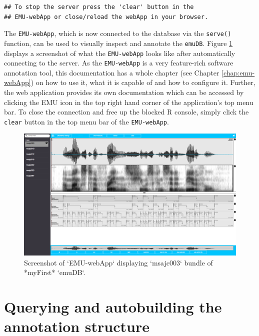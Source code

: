 \documentclass[]{book}
\theoremstyle{definition}
\theoremstyle{definition}
\theoremstyle{definition}
\theoremstyle{remark}
\begin{document}
\begin{verbatim}
## To stop the server press the 'clear' button in the 
## EMU-webApp or close/reload the webApp in your browser.
\end{verbatim}

The \texttt{EMU-webApp}, which is now connected to the database via the
\texttt{serve()} function, can be used to visually inspect and annotate
the \texttt{emuDB}. Figure \ref{fig:tutorial-emuWebAppMyFirst} displays
a screenshot of what the \texttt{EMU-webApp} looks like after
automatically connecting to the server. As the \texttt{EMU-webApp} is a
very feature-rich software annotation tool, this documentation has a
whole chapter (see Chapter \ref{chap:emu-webApp}) on how to use it, what
it is capable of and how to configure it. Further, the web application
provides its own documentation which can be accessed by clicking the EMU
icon in the top right hand corner of the application's top menu bar. To
close the connection and free up the blocked R console, simply click the
\texttt{clear} button in the top menu bar of the \texttt{EMU-webApp}.

\begin{figure}

{\centering \includegraphics[width=1\linewidth]{pics/tutorialEmuWebAppMyFirst} 

}

\caption{Screenshot of `EMU-webApp` displaying `msajc003` bundle of *myFirst* `emuDB`.}\label{fig:tutorial-emuWebAppMyFirst}
\end{figure}

\hypertarget{querying-and-autobuilding-the-annotation-structure}{%
\section{Querying and autobuilding the annotation
structure}\label{querying-and-autobuilding-the-annotation-structure}}
\end{document}
